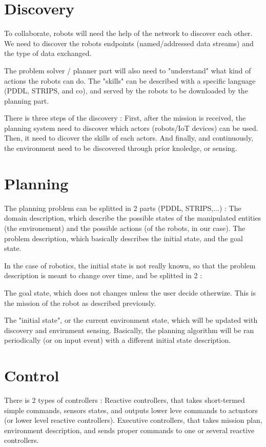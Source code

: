 \documentclass[conference]{IEEEtran}
\begin{document}
\section{Discovery}

To collaborate, robots will need the help of the network to discover each other.
We need to discover the robots endpoints (named/addressed data streams) and the type of data exchanged.

The problem solver / planner part will also need to "understand" what kind of actions the robots can do.
The "skills" can be described with a specific language (PDDL, STRIPS, and co), and served by the robots to be downloaded by the planning part.

There is three steps of the discovery : 
First, after the mission is received, the planning system need to discover which actors (robots/IoT devices) can be used.
Then, it need to dicover the skills of each actors.
And finally, and continuously, the environment need to be discovered through prior knoledge, or sensing.

\section{Planning}

The planning problem can be splitted in 2 parts (PDDL, STRIPS,...) : 
The domain description, which describe the possible states of the manipulated entities (the environement) and the possible actions (of the robots, in our case).
The problem description, which basically describes the initial state, and the goal state.

In the case of robotics, the initial state is not really known, so that the problem description is meant to change over time, and be splitted in 2 : 

The goal state, which does not changes unless the user decide otherwize.
This is the mission of the robot as described previously.

The "initial state", or the current environment state, which will be updated with discovery and envirnment sensing.
Basically, the planning algorithm will be ran periodically (or on input event) with a different initial state description.

\section{Control}

There is 2 types of controllers : 
Reactive controllers, that takes short-termed simple commands, sensors states, and outputs lower leve commands to actuators (or lower level reactive controllers).
Executive controllers, that takes mission plan, environment description, and sends proper commands to one or several reactive controllers.
\end{document}

